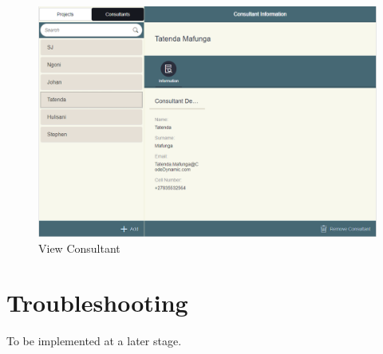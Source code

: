 \documentclass[a4paper, 12pt, oneside]{article}
\begin{document}
\begin{figure}[h]

  \centering

  \includegraphics[width=\linewidth]{images/viewConsultant.PNG}

  \caption{View Consultant}

  \label{fig:sfig1}

\end{figure}



\section{Troubleshooting}

To be implemented at a later stage.
\end{document}
